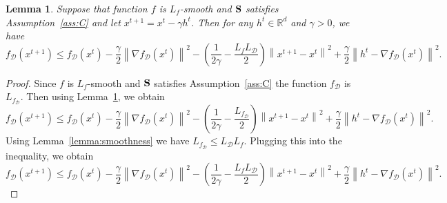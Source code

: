 \documentclass{article}
\newtheorem{lemma}{Lemma}
\theoremstyle{plain}
\newcommand{\tf}{f_{\mathcal{D}}}
\newcommand{\mS}{{\bf S}}
\theoremstyle{plain}
\theoremstyle{definition}
\theoremstyle{remark}
\begin{document}
\begin{lemma}
\label{lemma:Page}
Suppose that function $f$ is $L_f$-smooth and $\mS$ satisfies Assumption~\ref{ass:C} and let $x^{t+1} = x^t - \gamma h^t$. Then for any $h^t \in \mathbb{R}^d$ and $\gamma>0$, we have
       \begin{equation}
       \tf\left(x^{t+1}\right) \leq  \tf\left(x^t\right)-\frac{\gamma}{2}\left\|\nabla  \tf(x^t)\right\|^2-\left(\frac{1}{2 \gamma}-\frac{L_{f}L_{\mathcal{D}}}{2}\right)\left\|x^{t+1}-x^t\right\|^2+\frac{\gamma}{2}\left\|h^t-\nabla  \tf (x^t)\right\|^2.
   \end{equation}
\end{lemma}
\begin{proof}
    Since $f$ is $L_f$-smooth and $\mS$ satisfies Assumption~\ref{ass:C} the function $f_\mathcal{D}$ is $L_{\tf}$. Then using Lemma~\ref{lemma:Page}, we obtain
           \begin{equation*}
       \tf\left(x^{t+1}\right) \leq  \tf\left(x^t\right)-\frac{\gamma}{2}\left\|\nabla  \tf(x^t)\right\|^2-\left(\frac{1}{2 \gamma}-\frac{L_{\tf}}{2}\right)\left\|x^{t+1}-x^t\right\|^2+\frac{\gamma}{2}\left\|h^t-\nabla  \tf (x^t)\right\|^2.
   \end{equation*}
   Using Lemma~\ref{lemma:smoothness} we have $L_{\tf} \leq L_{\mathcal{D}} L_f $. Plugging this into the inequality, we obtain
          \begin{equation}
       \tf\left(x^{t+1}\right) \leq  \tf\left(x^t\right)-\frac{\gamma}{2}\left\|\nabla  \tf(x^t)\right\|^2-\left(\frac{1}{2 \gamma}-\frac{L_{f}L_{\mathcal{D}}}{2}\right)\left\|x^{t+1}-x^t\right\|^2+\frac{\gamma}{2}\left\|h^t-\nabla  \tf (x^t)\right\|^2.
   \end{equation}
\end{proof}
\end{document}
